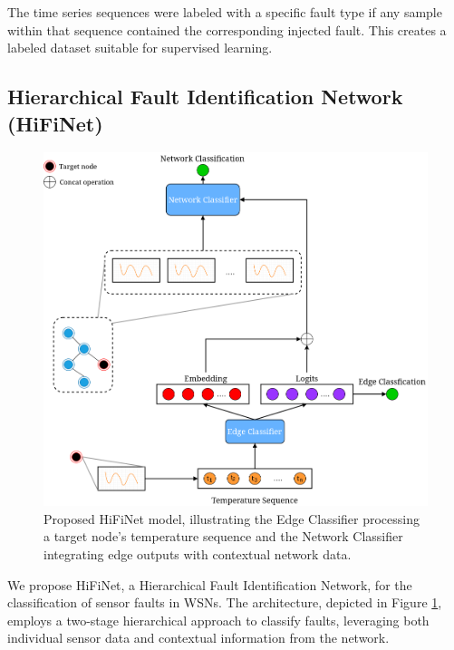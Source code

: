 The time series sequences were labeled with a specific fault type if any sample within that sequence contained the corresponding injected fault. This creates a labeled dataset suitable for supervised learning.

\subsection{Hierarchical Fault Identification Network (HiFiNet)}
\begin{figure}[htbp]
  \centering
  \includegraphics[width=0.8\linewidth]{images/HiFiNet.png}
  \caption{Proposed HiFiNet model, illustrating the Edge Classifier processing a target node's temperature sequence and the Network Classifier integrating edge outputs with contextual network data.}
  \label{fig:hifinet}
\end{figure}
We propose HiFiNet, a Hierarchical Fault Identification Network, for the classification of sensor faults in WSNs. The architecture, depicted in Figure \ref{fig:hifinet}, employs a two-stage hierarchical approach to classify faults, leveraging both individual sensor data and contextual information from the network.

